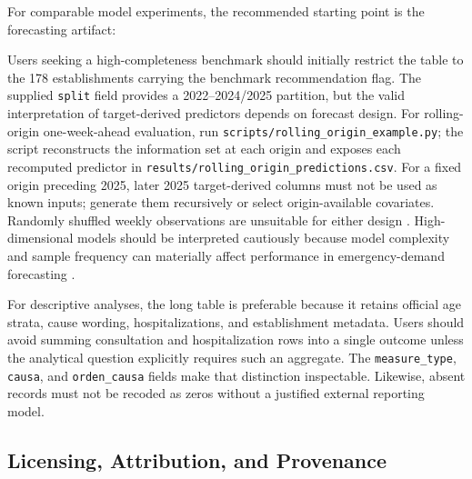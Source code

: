 \documentclass[data,datadescriptor,submit,moreauthors,pdftex]{Definitions/mdpi}
\begin{document}
For comparable model experiments, the recommended starting point is the forecasting artifact:
\begin{center}
\end{center}
Users seeking a high-completeness benchmark should initially restrict the table to the 178 establishments carrying the benchmark recommendation flag. The supplied \texttt{split} field provides a 2022--2024/2025 partition, but the valid interpretation of target-derived predictors depends on forecast design. For rolling-origin one-week-ahead evaluation, run \texttt{scripts/rolling\_origin\_example.py}; the script reconstructs the information set at each origin and exposes each recomputed predictor in \texttt{results/rolling\_origin\_predictions.csv}. For a fixed origin preceding 2025, later 2025 target-derived columns must not be used as known inputs; generate them recursively or select origin-available covariates. Randomly shuffled weekly observations are unsuitable for either design \citep{Hyndman2021}. High-dimensional models should be interpreted cautiously because model complexity and sample frequency can materially affect performance in emergency-demand forecasting \citep{Tuominen2022,Blanco2026}.

For descriptive analyses, the long table is preferable because it retains official age strata, cause wording, hospitalizations, and establishment metadata. Users should avoid summing consultation and hospitalization rows into a single outcome unless the analytical question explicitly requires such an aggregate. The \texttt{measure\_type}, \texttt{causa}, and \texttt{orden\_causa} fields make that distinction inspectable. Likewise, absent records must not be recoded as zeros without a justified external reporting model.

\subsection{Licensing, Attribution, and Provenance}
\end{document}
